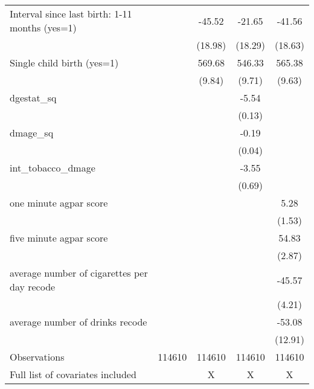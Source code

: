 {\begin{tabular}{l*{4}{c}}
Interval since last birth: 1-11 months (yes=1)    &            &      -45.52&      -21.65&      -41.56\\
                                                  &            &     (18.98)&     (18.29)&     (18.63)\\
Single child birth (yes=1)                        &            &      569.68&      546.33&      565.38\\
                                                  &            &      (9.84)&      (9.71)&      (9.63)\\
dgestat\_sq                                        &            &            &       -5.54&            \\
                                                  &            &            &      (0.13)&            \\
dmage\_sq                                          &            &            &       -0.19&            \\
                                                  &            &            &      (0.04)&            \\
int\_tobacco\_dmage                                 &            &            &       -3.55&            \\
                                                  &            &            &      (0.69)&            \\
one minute agpar score                            &            &            &            &        5.28\\
                                                  &            &            &            &      (1.53)\\
five minute agpar score                           &            &            &            &       54.83\\
                                                  &            &            &            &      (2.87)\\
average number of cigarettes per day recode       &            &            &            &      -45.57\\
                                                  &            &            &            &      (4.21)\\
average number of drinks recode                   &            &            &            &      -53.08\\
                                                  &            &            &            &     (12.91)\\
\hline
Observations                                      &      114610&      114610&      114610&      114610\\
Full list of covariates included                  &            &           X&           X&           X\\
\hline\hline
\end{tabular}
}
